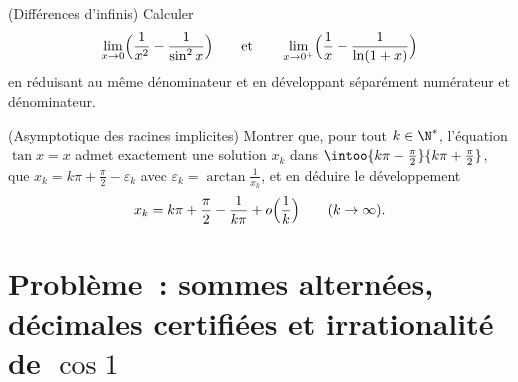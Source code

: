 \begin{exercise}[$\star\star$]\label{exo:b1:taylor:11}
(Différences d'infinis) Calculer
\[
\lim_{x \to 0} \Bigl(\frac{1}{x^2} - \frac{1}{\sin^2 x}\Bigr)
\qquad\text{et}\qquad
\lim_{x \to 0^+} \Bigl(\frac 1x - \frac{1}{\ln(1 + x)}\Bigr)
\]
en réduisant au même dénominateur et en développant séparément
numérateur et dénominateur.
\end{exercise}

\begin{exercise}[$\star\star\star$]\label{exo:b1:taylor:12}
(Asymptotique des racines implicites) Montrer que, pour tout $k \in
\N^*$, l'équation $\tan x = x$ admet exactement une solution $x_k$
dans $\intoo{k\pi - \frac\pi2}{k\pi + \frac\pi2}$, que $x_k = k\pi
+ \frac\pi2 - \varepsilon_k$ avec $\varepsilon_k =
\arctan\frac{1}{x_k}$, et en déduire le développement
\[
x_k = k\pi + \frac\pi2 - \frac{1}{k\pi} + o\Bigl(\frac
1k\Bigr) \qquad (k \to \infty).
\]
\end{exercise}

\section{Problème~: sommes alternées, décimales certifiées et
irrationalité de $\cos 1$}

